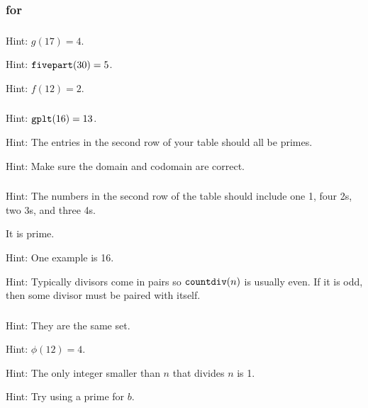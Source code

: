\subsubsection{\answers for  \subnumberfn}

\subsubsection*{ \answers}
\begin{apart}
    \item Hint: $g(17) = 4$.
    \item Hint: $\texttt{fivepart}(30)=5$.
    \item Hint: $f(12) = 2$.
\end{apart}

\subsubsection*{ \answers}
\begin{apart}
    \item Hint: $\texttt{gplt}(16)=13$.
    \item Hint: The entries in the second row of your table should all be primes.
    \item Hint: Make sure the domain and codomain are correct.
\end{apart}

\subsubsection*{ \answers}
\begin{apart}
    \item Hint: The numbers in the second row of the table should include one 1, four 2s, two 3s, and three 4s.
    \item It is prime.
    \item Hint: One example is 16.
    \item Hint: Typically divisors come in pairs so $\texttt{countdiv}(n)$ is usually even.  If it is odd, then some divisor must be paired with itself.
\end{apart}

\subsubsection*{ \answers}
\begin{apart}
    \item Hint: They are the same set.
    \item Hint: $\phi(12) = 4$.
    \item Hint: The only integer smaller than $n$ that divides $n$ is 1.
    \item Hint: Try using a prime for $b$.
\end{apart}

